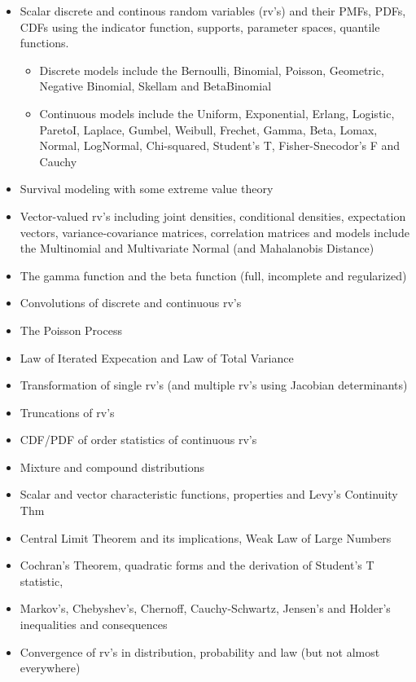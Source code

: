 \documentclass[12pt]{article}
\begin{document}
\begin{itemize}
\itemsep -0.0em 
\item Scalar discrete and continous random variables (rv's) and their PMFs, PDFs, CDFs using the indicator function, supports, parameter spaces, quantile functions.
\begin{itemize}
\item Discrete models include the Bernoulli, Binomial, Poisson, Geometric, Negative Binomial, Skellam and BetaBinomial
\item Continuous models include the Uniform, Exponential, Erlang, Logistic, ParetoI, Laplace, Gumbel, Weibull, Frechet, Gamma, Beta, Lomax, Normal, LogNormal, Chi-squared, Student's T, Fisher-Snecodor's F and Cauchy
\end{itemize}
\item Survival modeling with some extreme value theory
\item Vector-valued rv's including joint densities, conditional densities, expectation vectors, variance-covariance matrices, correlation matrices and models include the Multinomial and Multivariate Normal (and Mahalanobis Distance)
\item The gamma function and the beta function (full, incomplete and regularized)
\item Convolutions of discrete and continuous rv's
\item The Poisson Process
\item Law of Iterated Expecation and Law of Total Variance
\item Transformation of single rv's (and multiple rv's using Jacobian determinants)
\item Truncations of rv's
\item CDF/PDF of order statistics of continuous rv's
\item Mixture and compound distributions
\item Scalar and vector characteristic functions, properties and Levy's Continuity Thm
\item Central Limit Theorem and its implications, Weak Law of Large Numbers
\item Cochran's Theorem, quadratic forms and the derivation of Student's T statistic, 
\item Markov's, Chebyshev's, Chernoff, Cauchy-Schwartz, Jensen's and Holder's inequalities and consequences
\item Convergence of rv's in distribution, probability and law (but not almost everywhere)
\end{itemize}
\end{document}
